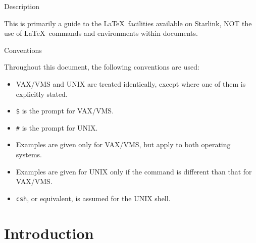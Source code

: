 \begin{center}
{\Large Description}
\end{center}
 
This is primarily a guide to the \LaTeX\ facilities available on
Starlink, NOT the use of \LaTeX\ commands and environments within
documents.


\setlength{\parskip}{2mm}
\tableofcontents
\setlength{\parskip}{\medskipamount}
\markright{\stardocname}


\begin{center}
{\Large Conventions}
\end{center}

Throughout this document, the following conventions are used:

\begin{itemize}

\item VAX/VMS and UNIX are treated identically, except where one of them
is explicitly stated.

\item {\tt \$} is the prompt for VAX/VMS.

\item {\tt \#} is the prompt for UNIX.

\item Examples are given only for VAX/VMS, but apply to both operating
systems.

\item Examples are given for UNIX only if the command is different than
that for VAX/VMS.

\item {\tt csh}, or equivalent, is assumed for the UNIX shell.

\end{itemize}


\newpage

\section{Introduction}
\label{se:intro}

